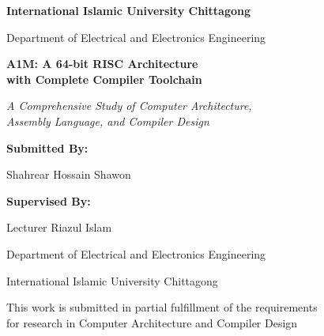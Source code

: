 \documentclass[12pt,a4paper,oneside]{book}
\begin{document}
\begin{titlepage}
    \centering
    \vspace*{1cm}
    
    {\LARGE\bfseries International Islamic University Chittagong\par}
    \vspace{0.5cm}
    {\large Department of Electrical and Electronics Engineering\par}
    \vspace{2cm}
    
    {\Huge\bfseries A1M: A 64-bit RISC Architecture\\[0.5cm]
    with Complete Compiler Toolchain\par}
    \vspace{1cm}
    
    {\Large\itshape A Comprehensive Study of Computer Architecture,\\
    Assembly Language, and Compiler Design\par}
    \vspace{2cm}
    
    {\Large\bfseries Submitted By:\par}
    \vspace{0.5cm}
    {\large Shahrear Hossain Shawon\par}
    \vspace{2cm}
    
    {\Large\bfseries Supervised By:\par}
    \vspace{0.5cm}
    {\large Lecturer Riazul Islam\par}
    {\large Department of Electrical and Electronics Engineering\par}
    {\large International Islamic University Chittagong\par}
    \vspace{2cm}
    
    \vfill
    
    {\small This work is submitted in partial fulfillment of the requirements\\
    for research in Computer Architecture and Compiler Design\par}
\end{titlepage}

\end{document}
